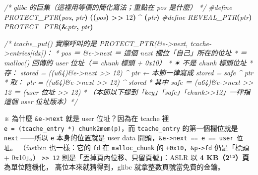\documentclass[10pt,a4paper]{article}
\newenvironment{Shaded}{\begin{snugshade}}{\end{snugshade}}
\newcommand{\CommentTok}[1]{\textcolor[rgb]{0.56,0.35,0.01}{\textit{#1}}}
\newcommand{\DecValTok}[1]{\textcolor[rgb]{0.00,0.00,0.81}{#1}}
\newcommand{\OperatorTok}[1]{\textcolor[rgb]{0.81,0.36,0.00}{\textbf{#1}}}
\newcommand{\PreprocessorTok}[1]{\textcolor[rgb]{0.56,0.35,0.01}{\textit{#1}}}
\renewenvironment{Shaded}{%
  \def\FrameCommand{\fboxsep=3.2pt\colorbox{shadecolor}}%
  \MakeFramed{\advance\hsize-\width\FrameRestore\small}%
}{%
  \endMakeFramed
}
\renewenvironment{quote}{%
  \begin{mdframed}[linewidth=0pt,innerleftmargin=0pt,innerrightmargin=0pt,
    innerbottommargin=0pt,innertopmargin=0pt,skipabove=0.55em,skipbelow=0.55em,
    leftmargin=0.9em,rightmargin=0.4em,startcode={\color{quotebar}\vrule width 2.6pt},%
    endcode={}]%
  \itshape\color{black}%
}{%
  \end{mdframed}%
}
\begin{document}
\begin{Shaded}
\begin{Highlighting}[]
\CommentTok{/* glibc 的巨集（這裡用等價的簡化寫法；重點在 pos 是什麼） */}
\PreprocessorTok{\#define PROTECT\_PTR}\OperatorTok{(}\PreprocessorTok{pos}\OperatorTok{,}\PreprocessorTok{ ptr}\OperatorTok{)}\PreprocessorTok{  }\OperatorTok{((}\PreprocessorTok{pos}\OperatorTok{)}\PreprocessorTok{ }\OperatorTok{\textgreater{}\textgreater{}}\PreprocessorTok{ }\DecValTok{12}\OperatorTok{)}\PreprocessorTok{ }\OperatorTok{\^{}}\PreprocessorTok{ }\OperatorTok{(}\PreprocessorTok{ptr}\OperatorTok{)}
\PreprocessorTok{\#define REVEAL\_PTR}\OperatorTok{(}\PreprocessorTok{ptr}\OperatorTok{)}\PreprocessorTok{        PROTECT\_PTR}\OperatorTok{(\&}\PreprocessorTok{ptr}\OperatorTok{,}\PreprocessorTok{ ptr}\OperatorTok{)}

\CommentTok{/* tcache\_put() 實際呼叫的是 PROTECT\_PTR(\&e{-}\textgreater{}next, tcache{-}\textgreater{}entries[idx])：}
\CommentTok{ *   pos ＝ \&e{-}\textgreater{}next ＝ 這個 next 欄位「自己」所在的位址}
\CommentTok{ *                   ＝ malloc() 回傳的 user 位址（＝ chunk 標頭 + 0x10）}
\CommentTok{ *                   ✶ 不是 chunk 標頭位址}
\CommentTok{ *   存： stored = ((u64)\&e{-}\textgreater{}next \textgreater{}\textgreater{} 12) \^{} ptr      ← 本節一律寫成 stored = safe \^{} ptr}
\CommentTok{ *   取： ptr    = ((u64)\&e{-}\textgreater{}next \textgreater{}\textgreater{} 12) \^{} stored}
\CommentTok{ *   其中 safe ＝ (u64)\&e{-}\textgreater{}next \textgreater{}\textgreater{} 12 ＝ (user 位址 \textgreater{}\textgreater{} 12)}
\CommentTok{ *   （本節以下提到「key」「safe」「chunk\textgreater{}\textgreater{}12」一律指這個 user 位址版本）*/}
\end{Highlighting}
\end{Shaded}

\begin{quote}
※ 為什麼 \texttt{\&\allowbreak{}e-\allowbreak{}\textgreater{}\allowbreak{}next} 就是 user 位址？因為在 tcache
裡 \texttt{e\ \allowbreak{}=\ \allowbreak{}(tcache\_\allowbreak{}entry\ \allowbreak{}*)\ \allowbreak{}chunk2mem(p)}，而
\texttt{tcache\_\allowbreak{}entry} 的第一個欄位就是 \texttt{next} ------所以
\texttt{e} 本身的位置就是 user data
開頭，\texttt{\&\allowbreak{}e-\allowbreak{}\textgreater{}\allowbreak{}next\ \allowbreak{}==\ \allowbreak{}e\ \allowbreak{}==\ \allowbreak{}user\ \allowbreak{}位址}。 （fastbin
也一樣：它的 \texttt{fd} 在 \texttt{malloc\_\allowbreak{}chunk} 的
\texttt{+0x10}，\texttt{\&\allowbreak{}p-\allowbreak{}\textgreater{}\allowbreak{}fd} 仍是「標頭 + 0x10」。）
\texttt{\textgreater{}\allowbreak{}\textgreater{}\allowbreak{}\ \allowbreak{}12}
則是「丟掉頁內位移、只留頁號」：ASLR 以 \textbf{4
KB（2¹²）頁}為單位隨機化， 高位本來就猜得到，glibc
就拿整數頁號當免費的金鑰。
\end{quote}
\end{document}
